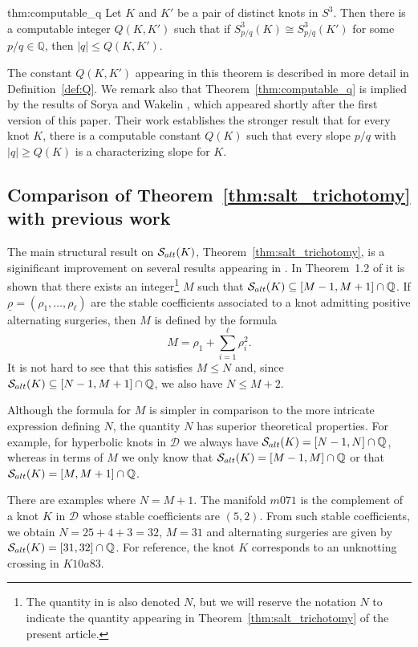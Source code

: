 \documentclass{amsart} %
\newcommand{\D}{\mathcal{D}}
\newcommand{\Q}{\mathbb{Q}}
\newcommand{\Salt}{\mathcal{S}_{\rm alt}}
\theoremstyle{thm}
\theoremstyle{definition}
\numberwithin{equation}{section}
\begin{document}
\newcommand{\computableq}{Let $K$ and $K'$ be a pair of distinct knots in $S^3$. Then there is a computable integer $Q(K,K')$ such that if $S_{p/q}^3(K)\cong  S_{p/q}^3(K')$ for some $p/q\in \Q$, then $|q|\leq Q(K,K')$.} 

\begin{repthm}{thm:computable_q}
    \computableq
\end{repthm}

The constant $Q(K,K')$ appearing in this theorem is described in more detail in Definition~\ref{def:Q}. We remark also that Theorem~\ref{thm:computable_q} is implied by the results of Sorya and Wakelin \cite{Sorya2024effective}, which appeared shortly after the first version of this paper. Their work establishes the stronger result that for every knot $K$, there is a computable constant $Q(K)$ such that every slope $p/q$ with $|q|\geq Q(K)$ is a characterizing slope for $K$.

\subsection{Comparison of Theorem~\ref{thm:salt_trichotomy} with previous work}

The main structural result on $\Salt(K)$, Theorem~\ref{thm:salt_trichotomy}, is a siginificant improvement on several results appearing in \cite{Mc17}. In Theorem~1.2 of \cite{Mc17} it is shown that there exists an integer\footnote{The quantity in \cite{Mc17} is also denoted $N$, but we will reserve the notation $N$ to indicate the quantity appearing in Theorem~\ref{thm:salt_trichotomy} of the present article.} $M$ such that $\Salt(K)\subseteq [M-1,M+1]\cap \Q$. If $\underline{\rho}=(\rho_1, \dots, \rho_\ell)$ are the stable coefficients associated to a knot admitting positive alternating surgeries, then $M$ is defined by the formula
\[
M=\rho_1+\sum_{i=1}^\ell \rho_i^2.
\]
It is not hard to see that this satisfies $M\leq N$ and, since $\Salt(K)\subseteq [N-1,M+1]\cap \Q$, we also have $N\leq M+2$.

Although the formula for $M$ is simpler in comparison to the more intricate expression defining $N$, the quantity $N$ has superior theoretical properties. For example, for hyperbolic knots in $\D$ we always have $\Salt(K)=[N-1,N]\cap \Q$, whereas in terms of $M$ we only know that $\Salt(K)=[M-1,M]\cap \Q$ or that $\Salt(K)=[M,M+1]\cap \Q$.

There are examples where $N=M+1$. The manifold $m071$ is the complement of a knot $K$ in $\D$ whose stable coefficients are $(5, 2)$. From such stable coefficients, we obtain $N=25+4+3=32$, $M=31$ and alternating surgeries are given by $\Salt(K) =[31,32]\cap \Q$. For reference, the knot $K$ corresponds to an unknotting crossing in $K10a83$.
\end{document}

